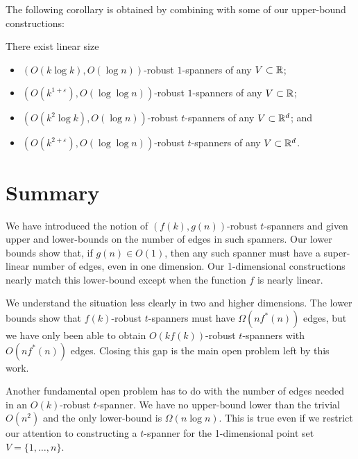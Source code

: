 \documentclass{patmorin}
\newcommand{\eps}{\varepsilon}
\begin{document}
The following corollary is obtained by combining 
with some of our upper-bound constructions:
\begin{cor}
  There exist linear size
  \begin{itemize}
    \item $(O(k\log k),O(\log n))$-robust $1$-spanners of any
      $V\subset \mathbb{R}$;
    \item $(O(k^{1+\eps}),O(\log\log n))$-robust $1$-spanners of any
      $V\subset \mathbb{R}$;
    \item $(O(k^2\log k), O(\log n))$-robust $t$-spanners of any
      $V\subset \mathbb{R}^d$; and
    \item $(O(k^{2+\eps}), O(\log\log n))$-robust $t$-spanners of any
      $V\subset \mathbb{R}^d$.
  \end{itemize}
\end{cor}

\section{Summary}

We have introduced the notion of $(f(k),g(n))$-robust $t$-spanners and
given upper and lower-bounds on the number of edges in such spanners.
Our lower bounds show that, if $g(n)\in O(1)$, then any such spanner
must have a super-linear number of edges, even in one dimension.
Our 1-dimensional constructions nearly match this lower-bound except
when the function $f$ is nearly linear.

We understand the situation less clearly in two and higher dimensions.
The lower bounds show that $f(k)$-robust $t$-spanners must have
$\Omega(nf^*(n))$ edges, but we have only been able to obtain
$O(kf(k))$-robust $t$-spanners with $O(nf^*(n))$ edges.  Closing this
gap is the main open problem left by this work.

Another fundamental open problem has to do with the number of edges needed
in an $O(k)$-robust $t$-spanner.  We have no upper-bound lower than the
trivial $O(n^2)$ and the only lower-bound is $\Omega(n\log n)$.  This is
true even if we restrict our attention to constructing a $t$-spanner
for the 1-dimensional point set $V=\{1,\ldots,n\}$.



\end{document}
